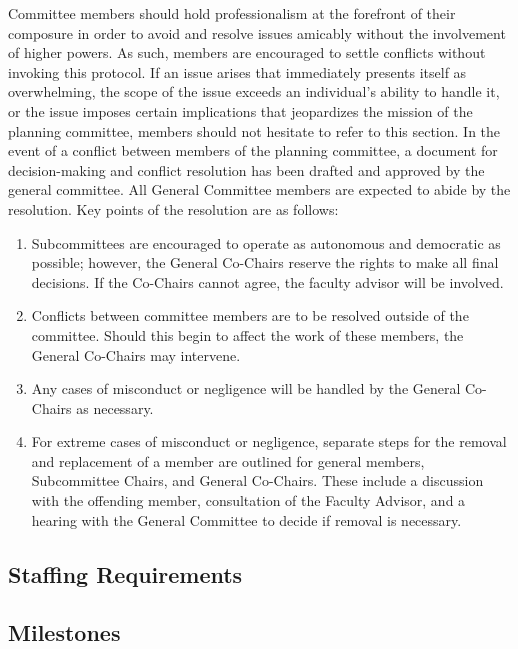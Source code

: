 Committee members should hold professionalism at the forefront of their composure in order to avoid and resolve issues amicably without the involvement of higher powers. As such, members are encouraged to settle conflicts without invoking this protocol. If an issue arises that immediately presents itself as overwhelming, the scope of the issue exceeds an individual’s ability to handle it, or the issue imposes certain implications that jeopardizes the mission of the planning committee, members should not hesitate to refer to this section. In the event of a conflict between members of the planning committee, a document for decision-making and
conflict resolution has been drafted and approved by the general committee. All General Committee members
are expected to abide by the resolution. Key points of the resolution are as follows:
\begin{enumerate}
	\item Subcommittees are encouraged to operate as autonomous and democratic as possible; however, the General
	Co-Chairs reserve the rights to make all final decisions. If the Co-Chairs cannot agree, the faculty advisor will be involved.
	\item Conflicts between committee members are to be resolved outside of the committee. Should this begin to
	affect the work of these members, the General Co-Chairs may intervene.
	\item Any cases of misconduct or negligence will be handled by the General Co-Chairs as necessary.
	\item For extreme cases of misconduct or negligence, separate steps for the removal and replacement of a
	member are outlined for general members, Subcommittee Chairs, and General Co-Chairs. These include
	a discussion with the offending member, consultation of the Faculty Advisor, and a hearing with the
	General Committee to decide if removal is necessary.
\end{enumerate}

\subsection{Staffing Requirements}


\subsection{Milestones}

